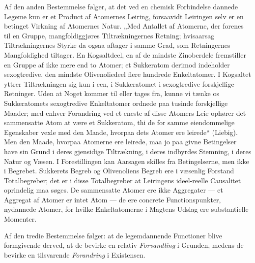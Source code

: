 \documentclass[12pt,a4paper]{book}
\begin{document}
Af den anden Bestemmelse følger, at det ved en chemisk Forbindelse dannede
Legeme kun er et Product af Atomernes Leiring, forsaavidt Leiringen selv
er en betinget Virkning af Atomernes Natur. „Med Antallet af Atomerne, der
forenes til en Gruppe, mangfoldiggjøres Tiltrækningernes Retning;
hvisaarsag Tiltrækningernes Styrke da ogsaa aftager i samme Grad, som
Retningernes Mangfoldighed tiltager. En Kogsaltdeel, en af de mindste
Zinoberdele fremstiller en Gruppe af ikke mere end to Atomer; et
Sukkeratom derimod indeholder sexogtredive, den mindste Olivenoliedeel
flere hundrede Enkeltatomer. I Kogsaltet yttrer Tiltrækningen sig kun i
een, i Sukkeratomet i sexogtredive forskjellige Retninger. Uden at Noget
kommer til eller tages fra, kunne vi tænke os Sukkeratomets sexogtredive
Enkeltatomer ordnede paa tusinde forskjellige Maader; med enhver
Forandring ved et eneste af disse Atomers Leie ophører det sammensatte
Atom at være et Sukkeratom, thi de for samme eiendommelige Egenskaber
vexle med den Maade, hvorpaa dets Atomer
ere leirede“ (Liebig). Men den Maade, hvorpaa Atomerne ere leirede, maa
jo paa givne Betingelser have sin Grund i deres gjensidige Tiltrækning, i
deres indbyrdes Stemning, i deres Natur og Væsen. I Forestillingen kan
Aarsagen skilles fra Betingelserne, men ikke i Begrebet. Sukkerets Begreb
og Olivenoliens Begreb ere i væsenlig Forstand Totalbegreber; det er i
disse Totalbegreber at Leiringens ideel-reelle Causalitet oprindelig maa
søges. De sammensatte Atomer ere ikke Aggregater --- et Aggregat af
Atomer er intet Atom --- de ere concrete Functionspunkter, nydannede
Atomer, for hvilke Enkeltatomerne i Magtens Udslag ere substantielle
Momenter.

Af den tredie Bestemmelse følger: at de legemdannende Functioner blive
formgivende derved, at de bevirke en relativ \emph{Forvandling} i
Grunden, medens de bevirke en tilsvarende \emph{Forandring} i Existensen.
\end{document}
